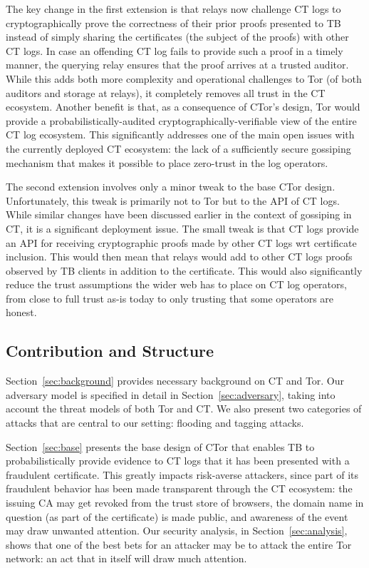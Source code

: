 The key change in the first extension is that relays now challenge CT logs to
cryptographically prove the correctness of their prior proofs presented to TB
instead of simply sharing the certificates (the subject of the proofs) with
other CT logs. In case an offending CT log fails to provide such a proof
in a timely manner,
the querying relay ensures that the proof arrives at a trusted auditor. While
this adds both more complexity and operational challenges to Tor (of both
auditors and storage at relays), it completely removes all trust in the CT
ecosystem. Another benefit is that, as a consequence of CTor's design, Tor would
provide a probabilistically-audited cryptographically-verifiable view of the
entire CT log ecosystem. This significantly addresses one of the main open
issues with the currently deployed CT ecosystem: the lack of a sufficiently
secure gossiping mechanism that makes it possible to place zero-trust in the log
operators.

The second extension involves only a minor tweak to the base CTor design.
Unfortunately, this tweak is primarily not to Tor but to the API of CT logs.
While similar changes have been discussed earlier in the context of gossiping in
CT, it is a significant deployment issue. The small tweak is that CT logs
provide an API for receiving cryptographic proofs made by other CT logs wrt
certificate inclusion. This would then mean that relays would add to
other CT logs proofs observed by TB clients in addition to the certificate.
This would also significantly reduce the trust assumptions the wider web has to
place on CT log operators, from close to full trust as-is today to only trusting
that some operators are honest.

\subsection{Contribution and Structure}
Section~\ref{sec:background} provides necessary background on CT and Tor. Our
adversary model is specified in detail in Section~\ref{sec:adversary}, taking
into account the threat models of both Tor and CT\@. We also present two
categories of attacks that are central to our setting: flooding and tagging
attacks.

Section~\ref{sec:base} presents the base design of CTor that enables TB to
probabilistically provide evidence to CT logs that it has been presented with a
fraudulent certificate. This greatly impacts risk-averse attackers, since part
of its fraudulent behavior has been made transparent through the CT ecosystem:
the issuing CA may get revoked from the trust store of browsers, the domain name
in question (as part of the certificate) is made public, and awareness of the
event may draw unwanted attention. Our security analysis, in
Section~\ref{sec:analysis}, shows that one of the best bets for an attacker may
be to attack the entire Tor network: an act that in itself will draw much
attention.

